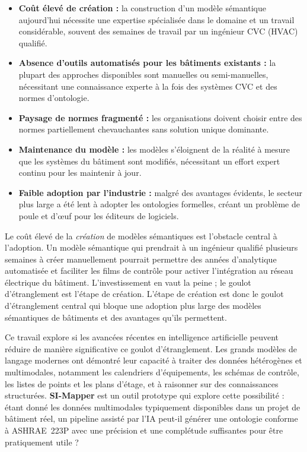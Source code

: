 \begin{itemize}[leftmargin=*, itemsep=2pt]
  \item \textbf{Coût élevé de création :} la construction d'un modèle sémantique aujourd'hui nécessite une expertise spécialisée dans le domaine et un travail considérable, souvent des semaines de travail par un ingénieur CVC (HVAC) qualifié.
  \item \textbf{Absence d'outils automatisés pour les bâtiments existants :} la plupart des approches disponibles sont manuelles ou semi-manuelles, nécessitant une connaissance experte à la fois des systèmes CVC et des normes d'ontologie.
  \item \textbf{Paysage de normes fragmenté :} les organisations doivent choisir entre des normes partiellement chevauchantes sans solution unique dominante.
  \item \textbf{Maintenance du modèle :} les modèles s'éloignent de la réalité à mesure que les systèmes du bâtiment sont modifiés, nécessitant un effort expert continu pour les maintenir à jour.
  \item \textbf{Faible adoption par l'industrie :} malgré des avantages évidents, le secteur plus large a été lent à adopter les ontologies formelles, créant un problème de poule et d'œuf pour les éditeurs de logiciels.
\end{itemize}

Le coût élevé de la \emph{création} de modèles sémantiques est l'obstacle central à l'adoption.
Un modèle sémantique qui prendrait à un ingénieur qualifié plusieurs semaines à créer manuellement pourrait permettre des années d'analytique automatisée et faciliter les films de contrôle pour activer l'intégration au réseau électrique du bâtiment.
L'investissement en vaut la peine ; le goulot d'étranglement est l'étape de création.
L'étape de création est donc le goulot d'étranglement central qui bloque une adoption plus large des modèles sémantiques de bâtiments et des avantages qu'ils permettent.

Ce travail explore si les avancées récentes en intelligence artificielle peuvent réduire de manière significative ce goulot d'étranglement.
Les grands modèles de langage modernes ont démontré leur capacité à traiter des données hétérogènes et multimodales, notamment les calendriers d'équipements, les schémas de contrôle, les listes de points et les plans d'étage, et à raisonner sur des connaissances structurées.
\textbf{SI-Mapper} est un outil prototype qui explore cette possibilité : étant donné les données multimodales typiquement disponibles dans un projet de bâtiment réel, un pipeline assisté par l'IA peut-il générer une ontologie conforme à ASHRAE~223P avec une précision et une complétude suffisantes pour être pratiquement utile ?

